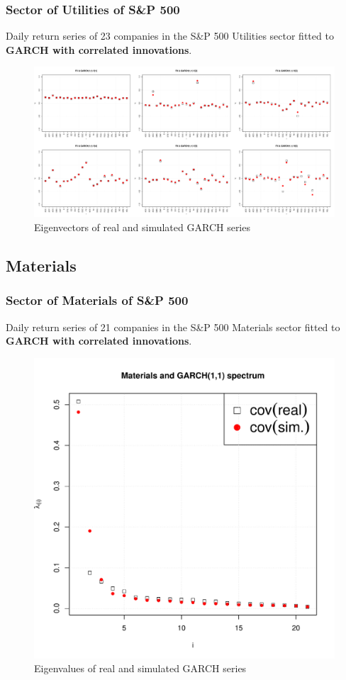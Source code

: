 \documentclass{beamer}
\begin{document}
\begin{frame}
  \frametitle{Sector of Utilities of S\&P 500}
  Daily return series of 23 companies in the S\&P 500 Utilities sector
  fitted to {\bf GARCH with correlated innovations}.
  \begin{figure}[htb!]
    \centering
    \includegraphics[width=1.0\linewidth]{Utilities_eigenvectors1.pdf}
    \caption{\scriptsize Eigenvectors of real and simulated GARCH series}
  \end{figure}
\end{frame}

\subsection{Materials}
\begin{frame}
  \frametitle{Sector of Materials of S\&P 500}
  Daily return series of 21 companies in the S\&P 500 Materials sector
  fitted to {\bf GARCH with correlated innovations}.
  \begin{figure}[htb!]
    \centering
    \includegraphics[scale=0.35]{Materials_eigenvalues.pdf}
    \caption{\scriptsize Eigenvalues of real and simulated GARCH series}
  \end{figure}
\end{frame}
\end{document}
